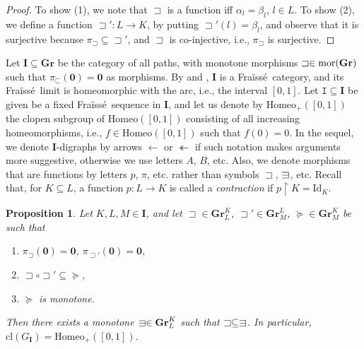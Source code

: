 \documentclass[12pt]{amsart}
\numberwithin{equation}{section}
\theoremstyle{plain}
\newtheorem{proposition}[theorem]{\bf Proposition}
\theoremstyle{definition}
\newcommand{\sqni}{\mathrel{\vphantom{\sqsupset}\text{\mathsurround=0pt\ooalign{$\sqsupset$\cr$-$\cr}}}}
\newcommand \Homeo{ \mbox{Homeo}}
\newcommand \Id{ \mbox{Id}}
\newcommand \sqsp{\sqsupset}
\newcommand \sqsb{\sqsubset}
\newcommand \la{\leftarrow}
\newcommand{\cl}{\mbox{cl}}
\newcommand \mor{{\rm{mor}}}
\newcommand \rt{\mathbf{0}}
\newcommand \fra{Fra\"{i}ss\'{e}}
\newcommand \uhr{\upharpoonright}
\newcommand \GGRb{\mathbf{Gr}}
\newcommand \IIb{\mathbf{I}}
\newcommand \It{\mathtt{I}}
\begin{document}
\begin{proof}
To show (1), we note that $\sqsp$ is a function iff $\alpha_l=\beta_l$, $l \in L$. To show (2), we define a function $\sqsp':L \to K$, by putting ${\sqsp'}(l)=\beta_l$, and observe that it is surjective because $\pi_\sqsp \subseteq \sqsp'$, and $\sqsp$ is co-injective, i.e., $\pi_\sqsp$ is surjective.
\end{proof}
  
Let $\IIb \subseteq \GGRb$ be the category of all paths, with monotone morphisms $\sqsp \in \mor(\GGRb)$ such that $\pi_\sqsb(\rt)=\rt$ as morphisms. By \cite[Proposition 5.13]{BaBiVi2} and \cite[Theorem 5.15]{BaBiVi2}, $\IIb$ is a \fra \ category, and its \fra \ limit is homeomorphic with  the arc, i.e., the interval $[0,1]$. Let $\It \subseteq \IIb$ be given be a fixed \fra \ sequence in $\IIb$, and let us denote by $\Homeo_+([0,1])$ the clopen subgroup of $\Homeo([0,1])$ consisting of all increasing homeomorphisms, i.e., $f \in  \Homeo([0,1])$ such that $f(0)=0$. In the sequel, we denote $\IIb$-digraphs by arrows $\la$ or $\twoheadleftarrow$ if such notation makes arguments more suggestive, otherwise we use letters $A$, $B$, etc. Also, we denote morphisms that are functions by letters $p$, $\pi$, etc. rather than symbols $\sqsp$, $\sqni$, etc. Recall that, for $K \subseteq L$, a function $p:L \to K$ is called a \emph{contraction} if $p \uhr K=\Id_K$.
  
  
  \begin{proposition}
  	\label{co:G_IDense}
  	Let $K,L,M \in \IIb$, and let $\sqsp \in \GGRb^K_L$, $\sqsp' \in \GGRb^L_M$, $\succeq \in \GGRb^K_M$ be such that
  	\begin{enumerate}
  		\item $\pi_{\sqsp}(\rt)=\rt$, $\pi_{\sqsp'}(\rt)=\rt$,
  		\item $\sqsp \circ \sqsp' \subseteq \succeq$,
  		\item $\succeq$ is monotone.
  	\end{enumerate}
  	Then there exists a monotone $\sqni \in \GGRb^K_L$ such that $\sqsp \subseteq \sqni$. In particular, $\cl(G_\IIb)=\Homeo_+([0,1])$. 
  \end{proposition}
  
\end{document}
